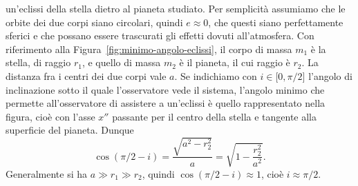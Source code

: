 un'eclissi della stella dietro al pianeta studiato. Per semplicità assumiamo che
le orbite dei due corpi siano circolari, quindi $e \approx 0$, che questi siano
perfettamente sferici e che possano essere trascurati gli effetti dovuti
all'atmosfera. Con riferimento alla Figura~\ref{fig:minimo-angolo-eclissi}, il
corpo di massa $m_1$ è la stella, di raggio $r_1$, e quello di massa $m_2$ è
il pianeta, il cui raggio è $r_2$. La distanza fra i centri dei due corpi vale
$a$. Se indichiamo con $i \in \mathopen{[}0, \pi/2\mathclose{]}$ l'angolo di
inclinazione sotto il quale l'osservatore vede il sistema, l'angolo minimo che
permette all'osservatore di assistere a un'eclissi è quello rappresentato nella
figura, cioè con l'asse $x''$ passante per il centro della stella e tangente
alla superficie del pianeta. Dunque
\begin{equation}
  \cos(\pi/2 - i) = \frac{\sqrt{a^2 - r_2^2}}{a} = \sqrt{1 - \frac{r_2^2}{a^2}}.
\end{equation}
Generalmente si ha $a \gg r_1 \gg r_2$, quindi $\cos(\pi/2 - i) \approx 1$,
cioè $i \approx \pi/2$.

